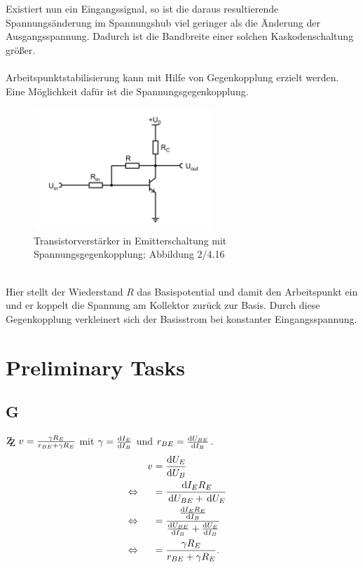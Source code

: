 \documentclass[a4paper,10pt]{article}
\newcommand{\td}{\,\text{d}}
\newcommand{\zz}{\mathrm{Z\kern-.3em\raise-0.5ex\hbox{Z} }}
\numberwithin{equation}{section}
\begin{document}
\begin{multicols}{2}
        Existiert nun ein Eingangssignal, so ist die daraus resultierende Spannungsänderung im Spannungshub viel geringer als die Änderung der Ausgangsspannung.
        Dadurch ist die Bandbreite einer solchen Kaskodenschaltung größer.
        \\\\Arbeitspunktstabilisierung kann mit Hilfe von Gegenkopplung erzielt werden.
        Eine Möglichkeit dafür ist die Spannungsgegenkopplung.
        \begin{figure}[h]
                \centering
                \includegraphics[width=0.6\textwidth]{spannungsgegenkopplung.png}
                \caption{Transistorverstärker in Emitterschaltung mit Spannungsgegenkopplung; Abbildung 2/4.16 \cite{Praktikumsanleitung}}
                \vspace{100cm}
        \end{figure}\\
        Hier stellt der Wiederstand $R$ das Basispotential und damit den Arbeitspunkt ein und er koppelt die Spannung am Kollektor zurück zur Basis.
        Durch diese Gegenkopplung verkleinert sich der Basisstrom bei konstanter Eingangsspannung.

        \newpage
        \section{Preliminary Tasks}
        \subsection{G}
        $\zz\ v=\tfrac{\gamma R_E}{r_{BE}+\gamma R_E}$ mit $\gamma =\diff[]{I_E}{I_B}$ und $r_{BE}=\diff[]{U_{BE}}{I_B}$.
        \begin{align} 
                && v &= \diff[]{U_E}{U_B} &&\\
                \Leftrightarrow && &= \dfrac{\td I_ER_E}{\td U_{BE}+\td U_E} &&\nonumber \\
                \Leftrightarrow && &= \dfrac{\diff[]{I_ER_E}{I_B}}{\diff[]{U_{BE}}{I_B}+\diff[]{U_E}{I_B}} &&\nonumber \\
                \Leftrightarrow && &= \dfrac{\gamma R_E}{r_{BE}+\gamma R_E}. &&
        \end{align} 


\end{multicols}
\end{document}
